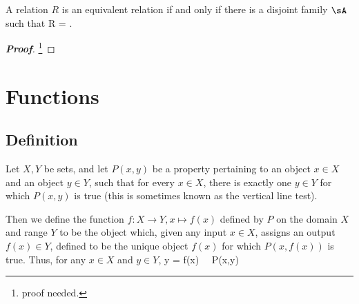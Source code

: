 \begin{theorem}
A relation $R$ is an equivalent relation if and only if there is a disjoint family $\sA$ such that
\be
R = \bigcup {}.
\ee
\end{theorem}

\begin{proof}[\bf Proof]
\footnote{proof needed.}
\end{proof}



\section{Functions}

\subsection{Definition}

\begin{definition}\label{def:function}
Let $X,Y$ be sets, and let $P(x,y)$ be a property pertaining to an object $x\in X$ and an object $y\in Y$, such that for every $x\in X$, there is exactly one $y\in Y$ for which $P(x,y)$ is true (this is sometimes known as the vertical line test).

Then we define the function $f:X\to Y, x\mapsto f(x)$ defined by $P$ on the domain $X$ and range $Y$ to be the object which, given any input $x\in X$, assigns an output $f(x)\in Y$, defined to be the unique object $f(x)$ for which $P(x,f(x))$ is true. Thus, for any $x\in X$ and $y\in Y$,
\be
y = f(x) \ \lra \ P(x,y)
\ee
\end{definition}


